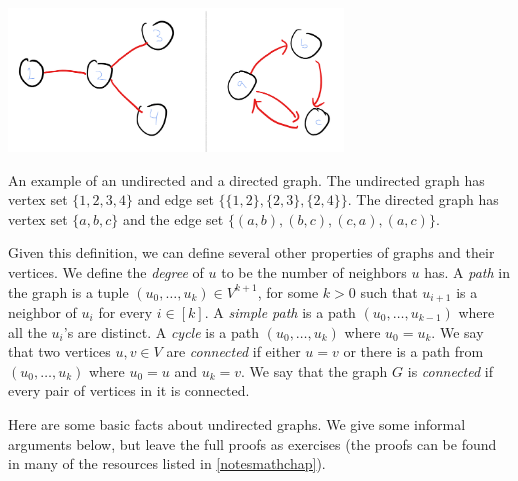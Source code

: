 \begin{marginfigure}[1.5in]
\centering
\includegraphics[width=\linewidth, height=1.5in, keepaspectratio]{../figure/graphsexampe.png}
\caption{An example of an undirected and a directed graph. The
undirected graph has vertex set \(\{1,2,3,4\}\) and edge set
\(\{ \{1,2\},\{2,3\},\{2,4\} \}\). The directed graph has vertex set
\(\{a,b,c\}\) and the edge set \(\{ (a,b),(b,c),(c,a),(a,c) \}\).}
\label{graphsexampefig}
\end{marginfigure}

\hypertarget{undirgraph}{}

Given this definition, we can define several other properties of graphs
and their vertices. We define the \emph{degree} of \(u\) to be the
number of neighbors \(u\) has. A \emph{path} in the graph is a tuple
\((u_0,\ldots,u_k) \in V^{k+1}\), for some \(k>0\) such that \(u_{i+1}\)
is a neighbor of \(u_i\) for every \(i\in [k]\). A \emph{simple path} is
a path \((u_0,\ldots,u_{k-1})\) where all the \(u_i\)'s are distinct. A
\emph{cycle} is a path \((u_0,\ldots,u_k)\) where \(u_0=u_{k}\). We say
that two vertices \(u,v\in V\) are \emph{connected} if either \(u=v\) or
there is a path from \((u_0,\ldots,u_k)\) where \(u_0=u\) and \(u_k=v\).
We say that the graph \(G\) is \emph{connected} if every pair of
vertices in it is connected.

Here are some basic facts about undirected graphs. We give some informal
arguments below, but leave the full proofs as exercises (the proofs can
be found in many of the resources listed in \cref{notesmathchap}).

\hypertarget{degreesegeslem}{}

